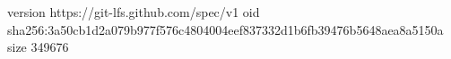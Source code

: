 version https://git-lfs.github.com/spec/v1
oid sha256:3a50cb1d2a079b977f576c4804004eef837332d1b6fb39476b5648aea8a5150a
size 349676
